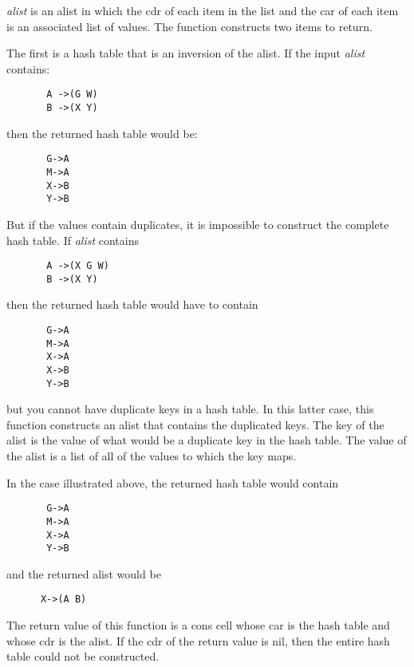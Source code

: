 \begin{doc-string}
\emph{alist} is an alist in which the cdr of each item in the list and the car of
each item is an associated list of values.  The function constructs two items to
return.

The first is a hash table that is an inversion of the alist.  If the input \emph{alist}
contains:

\small{\begin{verbatim}
       A ->(G W)
       B ->(X Y)
\end{verbatim}}

then the returned hash table would be:

\small{\begin{verbatim}
       G->A
       M->A
       X->B
       Y->B
\end{verbatim}}

But if the values contain duplicates, it is impossible to construct the complete
hash table.  If \emph{alist} contains

\small{\begin{verbatim}
       A ->(X G W)
       B ->(X Y)
\end{verbatim}}

then the returned hash table would have to contain

\small{\begin{verbatim}
       G->A
       M->A
       X->A
       X->B
       Y->B
\end{verbatim}}

but you cannot have duplicate keys in a hash table.  In this latter case, this
function constructs an alist that contains the duplicated keys.  The key of the
alist is the value of what would be a duplicate key in the hash table.  The
value of the alist is a list of all of the values to which the key maps.

In the case illustrated above, the returned hash table would contain

\small{\begin{verbatim}
       G->A
       M->A
       X->A
       Y->B
\end{verbatim}}

and the returned alist would be

\small{\begin{verbatim}
      X->(A B)
\end{verbatim}}

The return value of this function is a cons cell whose car is the hash table and
whose cdr is the alist.  If the cdr of the return value is nil, then the entire
hash table could not be constructed.
\end{doc-string}

